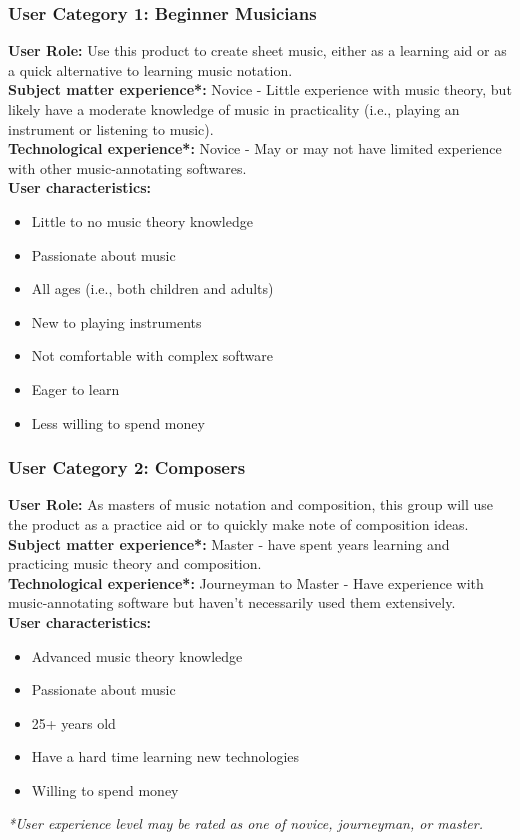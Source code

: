 \documentclass[12pt]{article}
\begin{document}
\subsubsection*{User Category 1: Beginner Musicians}
\textbf{User Role:} Use this product to create sheet music, either as a learning aid or as a quick alternative to learning music notation.\\
\textbf{Subject matter experience*:} Novice - Little experience with music theory, but likely have a moderate knowledge of music in practicality (i.e., playing an instrument or listening to music). \\
\textbf{Technological experience*:} Novice - May or may not have limited experience with other music-annotating softwares. \\
\textbf{User characteristics:} 
\begin{itemize}
  \item Little to no music theory knowledge
  \item Passionate about music
  \item All ages (i.e., both children and adults)
  \item New to playing instruments
  \item Not comfortable with complex software
  \item Eager to learn
  \item Less willing to spend money
\end{itemize}

\subsubsection*{User Category 2: Composers}
\textbf{User Role:} As masters of music notation and composition, this group will use the product as a practice aid or to quickly make note of composition ideas. \\
\textbf{Subject matter experience*:} Master - have spent years learning and practicing music theory and composition. \\
\textbf{Technological experience*:} Journeyman to Master - Have experience with music-annotating software but haven't necessarily used them extensively. \\
\textbf{User characteristics:}
\begin{itemize}
  \item Advanced music theory knowledge
  \item Passionate about music
  \item 25+ years old
  \item Have a hard time learning new technologies
  \item Willing to spend money
\end{itemize}
\noindent
\textit{*User experience level may be rated as one of novice, journeyman, or master.}
\end{document}
